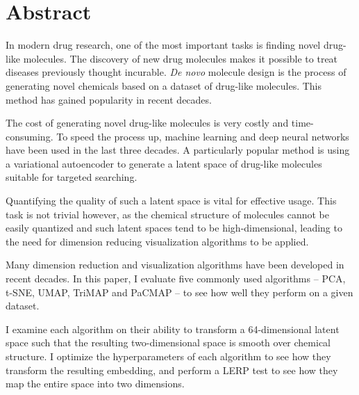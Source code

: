 \vfill
\selectenglish


\chapter*{Abstract}

In modern drug research, one of the most important tasks is finding novel drug-like molecules. The discovery of new drug molecules makes it possible to treat diseases previously thought incurable. \textit{De novo} molecule design is the process of generating novel chemicals based on a dataset of drug-like molecules. This method has gained popularity in recent decades.

The cost of generating novel drug-like molecules is very costly and time-consuming. To speed the process up, machine learning and deep neural networks have been used in the last three decades. A particularly popular method is using a variational autoencoder to generate a latent space of drug-like molecules suitable for targeted searching.

Quantifying the quality of such a latent space is vital for effective usage. This task is not trivial however, as the chemical structure of molecules cannot be easily quantized and such latent spaces tend to be high-dimensional, leading to the need for dimension reducing visualization algorithms to be applied.

Many dimension reduction and visualization algorithms have been developed in recent decades. In this paper, I evaluate five commonly used algorithms -- PCA, t-SNE, UMAP, TriMAP and PaCMAP -- to see how well they perform on a given dataset.

I examine each algorithm on their ability to transform a 64-dimensional latent space such that the resulting two-dimensional space is smooth over chemical structure. I optimize  the hyperparameters of each algorithm to see how they transform the resulting embedding, and perform a LERP test to see how they map the entire space into two dimensions.


\vfill
\cleardoublepage

\selectthesislanguage

\setcounter{romanPage}{\value{page}}
